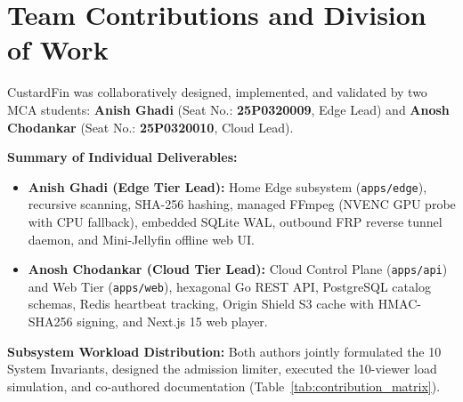 
\chapter{Team Contributions and Division of Work}
\label{chap:contributions}

\vspace{-0.4cm}
CustardFin was collaboratively designed, implemented, and validated by two MCA students: \textbf{Anish Ghadi} (Seat No.: \textbf{25P0320009}, Edge Lead) and \textbf{Anosh Chodankar} (Seat No.: \textbf{25P0320010}, Cloud Lead).

\vspace{0.15cm}
\noindent\textbf{Summary of Individual Deliverables:}
\begin{itemize}
    \setlength{\itemsep}{0pt}
    \setlength{\parskip}{0pt}
    \item \textbf{Anish Ghadi (Edge Tier Lead):} Home Edge subsystem (\texttt{apps/edge}), recursive scanning, SHA-256 hashing, managed FFmpeg (NVENC GPU probe with CPU fallback), embedded SQLite WAL, outbound FRP reverse tunnel daemon, and Mini-Jellyfin offline web UI.
    \item \textbf{Anosh Chodankar (Cloud Tier Lead):} Cloud Control Plane (\texttt{apps/api}) and Web Tier (\texttt{apps/web}), hexagonal Go REST API, PostgreSQL catalog schemas, Redis heartbeat tracking, Origin Shield S3 cache with HMAC-SHA256 signing, and Next.js 15 web player.
\end{itemize}

\vspace{0.15cm}
\noindent\textbf{Subsystem Workload Distribution:}
Both authors jointly formulated the 10 System Invariants, designed the admission limiter, executed the 10-viewer load simulation, and co-authored documentation (Table~\ref{tab:contribution_matrix}).

